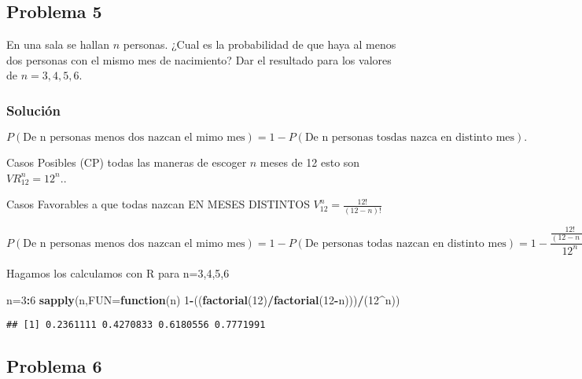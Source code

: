 \documentclass[
]{article}
\newenvironment{Shaded}{\begin{snugshade}}{\end{snugshade}}
\newcommand{\ControlFlowTok}[1]{\textcolor[rgb]{0.13,0.29,0.53}{\textbf{#1}}}
\newcommand{\DataTypeTok}[1]{\textcolor[rgb]{0.13,0.29,0.53}{#1}}
\newcommand{\DecValTok}[1]{\textcolor[rgb]{0.00,0.00,0.81}{#1}}
\newcommand{\KeywordTok}[1]{\textcolor[rgb]{0.13,0.29,0.53}{\textbf{#1}}}
\newcommand{\NormalTok}[1]{#1}
\newcommand{\OperatorTok}[1]{\textcolor[rgb]{0.81,0.36,0.00}{\textbf{#1}}}
\begin{document}
\hypertarget{problema-5}{%
\subsection{Problema 5}\label{problema-5}}

En una sala se hallan \(n\) personas. ¿Cual es la probabilidad de que
haya al menos dos personas con el mismo mes de nacimiento? Dar el
resultado para los valores de \(n=3,4,5,6\).

\hypertarget{soluciuxf3n-5}{%
\subsubsection{Solución}\label{soluciuxf3n-5}}

\[P(\mbox{De n personas menos dos nazcan el mimo mes})=1-P(\mbox{De n personas tosdas nazca en distinto mes}).\]

Casos Posibles (CP) todas las maneras de escoger \(n\) meses de 12 esto
son \(VR_{12}^n=12^n.\).

Casos Favorables a que todas nazcan EN MESES DISTINTOS
\(V_{12}^n=\frac{12!}{(12-n)!}\)

\[
P(\mbox{De n personas menos dos nazcan el mimo mes})=
1-P(\mbox{De personas todas nazcan en distinto mes})=
1-\frac{\frac{12!}{(12-n)!}}{12^n}.
\]

Hagamos los calculamos con R para n=3,4,5,6

\begin{Shaded}
\begin{Highlighting}[]
\NormalTok{n=}\DecValTok{3}\OperatorTok{:}\DecValTok{6}
\KeywordTok{sapply}\NormalTok{(n,}\DataTypeTok{FUN=}\ControlFlowTok{function}\NormalTok{(n) }\DecValTok{1}\OperatorTok{{-}}\NormalTok{((}\KeywordTok{factorial}\NormalTok{(}\DecValTok{12}\NormalTok{)}\OperatorTok{/}\KeywordTok{factorial}\NormalTok{(}\DecValTok{12}\OperatorTok{{-}}\NormalTok{n)))}\OperatorTok{/}\NormalTok{(}\DecValTok{12}\OperatorTok{\^{}}\NormalTok{n))}
\end{Highlighting}
\end{Shaded}

\begin{verbatim}
## [1] 0.2361111 0.4270833 0.6180556 0.7771991
\end{verbatim}

\hypertarget{problema-6}{%
\subsection{Problema 6}\label{problema-6}}
\end{document}
